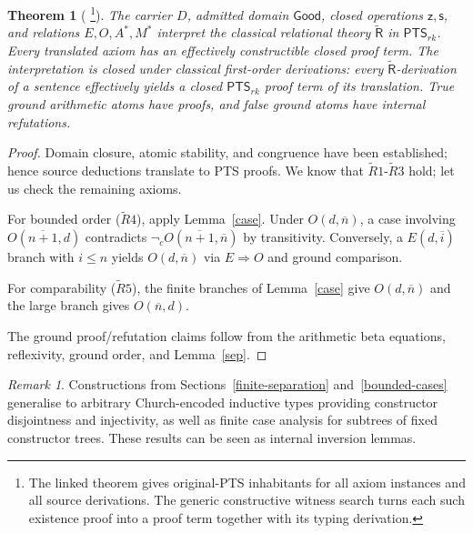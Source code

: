 \documentclass{article}
\newtheorem{theorem}{Theorem}
\theoremstyle{definition}
\theoremstyle{remark}
\newtheorem*{remark}{Remark}
\newcommand{\PTS}{\mathsf{PTS}_{rk}}
\newcommand{\Rt}{\widetilde{\mathsf R}}
\newcommand{\Good}{\mathsf{Good}}
\newcommand{\z}{\mathsf z}
\newcommand{\suc}{\mathsf s}
\newcommand{\nc}{\mathop{\neg}\nolimits_c}
\begin{document}
\begin{theorem}
    [
    \footnote{The linked theorem gives original-PTS
    inhabitants for all axiom instances and all source
    derivations. The generic constructive witness
    search turns each such existence proof into a proof
    term together with its typing derivation.}]
    \label{main}
    The carrier $D$, admitted domain $\Good$, closed
    operations $\z,\suc$, and relations $E,O,A^*,M^*$
    interpret the classical relational theory $\Rt$ in
    $\PTS$. Every translated axiom has an effectively
    constructible closed proof term. The interpretation
    is closed under classical first-order derivations:
    every $\Rt$-derivation of a sentence effectively
    yields a closed $\PTS$ proof term of its
    translation. True ground arithmetic atoms have
    proofs, and false ground atoms have internal
    refutations.
\end{theorem}
\begin{proof}
    Domain closure, atomic stability, and congruence
    have been established; hence source deductions
    translate to PTS proofs. We know that
    $\widetilde R1$-$\widetilde R3$ hold; let us check
    the remaining axioms.

    For bounded order ($\widetilde R4$), apply
    Lemma~\ref{case}. Under $O(d,\overline{n})$, a case
    involving $O(\overline{n+1},d)$ contradicts
    $\nc O(\overline{n+1},\overline{n})$ by
    transitivity.
    Conversely, a $E(d,\overline{i})$ branch with
    $i\le n$ yields $O(d,\overline{n})$ via
    $E\Rightarrow O$ and ground comparison.

    For comparability ($\widetilde R5$), the finite
    branches of Lemma~\ref{case} give
    $O(d,\overline{n})$ and the large branch gives
    $O(\overline{n},d)$.

    The ground proof/refutation claims follow from the
    arithmetic beta equations, reflexivity, ground
    order, and Lemma~\ref{sep}.
\end{proof}

\begin{remark}
    Constructions from Sections~\ref{finite-separation}
    and~\ref{bounded-cases} generalise to arbitrary
    Church-encoded inductive types providing
    constructor disjointness and injectivity, as well
    as finite case analysis for subtrees of fixed
    constructor trees. These results can be seen as
    internal inversion lemmas.
\end{remark}
\end{document}
